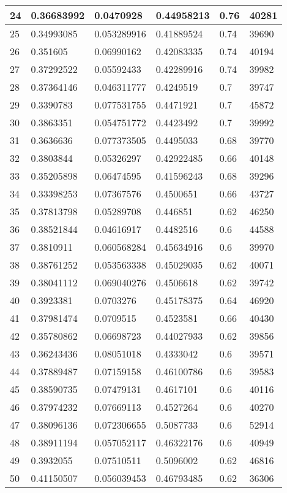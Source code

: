 \begin{longtable}{|l|l|l|l|l|l|}
24 & 0.36683992 & 0.0470928 & 0.44958213 & 0.76 & 40281 \\ \hline 
25 & 0.34993085 & 0.053289916 & 0.41889524 & 0.74 & 39690 \\ \hline 
26 & 0.351605 & 0.06990162 & 0.42083335 & 0.74 & 40194 \\ \hline 
27 & 0.37292522 & 0.05592433 & 0.42289916 & 0.74 & 39982 \\ \hline 
28 & 0.37364146 & 0.046311777 & 0.4249519 & 0.7 & 39747 \\ \hline 
29 & 0.3390783 & 0.077531755 & 0.4471921 & 0.7 & 45872 \\ \hline 
30 & 0.3863351 & 0.054751772 & 0.4423492 & 0.7 & 39992 \\ \hline 
31 & 0.3636636 & 0.077373505 & 0.4495033 & 0.68 & 39770 \\ \hline 
32 & 0.3803844 & 0.05326297 & 0.42922485 & 0.66 & 40148 \\ \hline 
33 & 0.35205898 & 0.06474595 & 0.41596243 & 0.68 & 39296 \\ \hline 
34 & 0.33398253 & 0.07367576 & 0.4500651 & 0.66 & 43727 \\ \hline 
35 & 0.37813798 & 0.05289708 & 0.446851 & 0.62 & 46250 \\ \hline 
36 & 0.38521844 & 0.04616917 & 0.4482516 & 0.6 & 44588 \\ \hline 
37 & 0.3810911 & 0.060568284 & 0.45634916 & 0.6 & 39970 \\ \hline 
38 & 0.38761252 & 0.053563338 & 0.45029035 & 0.62 & 40071 \\ \hline 
39 & 0.38041112 & 0.069040276 & 0.4506618 & 0.62 & 39742 \\ \hline 
40 & 0.3923381 & 0.0703276 & 0.45178375 & 0.64 & 46920 \\ \hline 
41 & 0.37981474 & 0.0709515 & 0.4523581 & 0.66 & 40430 \\ \hline 
42 & 0.35780862 & 0.06698723 & 0.44027933 & 0.62 & 39856 \\ \hline 
43 & 0.36243436 & 0.08051018 & 0.4333042 & 0.6 & 39571 \\ \hline 
44 & 0.37889487 & 0.07159158 & 0.46100786 & 0.6 & 39583 \\ \hline 
45 & 0.38590735 & 0.07479131 & 0.4617101 & 0.6 & 40116 \\ \hline 
46 & 0.37974232 & 0.07669113 & 0.4527264 & 0.6 & 40270 \\ \hline 
47 & 0.38096136 & 0.072306655 & 0.5087733 & 0.6 & 52914 \\ \hline 
48 & 0.38911194 & 0.057052117 & 0.46322176 & 0.6 & 40949 \\ \hline 
49 & 0.3932055 & 0.07510511 & 0.5096002 & 0.62 & 46816 \\ \hline 
50 & 0.41150507 & 0.056039453 & 0.46793485 & 0.62 & 36306 \\ \hline 
\end{longtable}